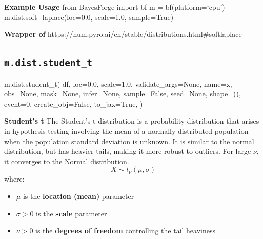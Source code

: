 \documentclass[
  letterpaper,
  DIV=11,
  numbers=noendperiod]{scrartcl}
\newenvironment{Shaded}{\begin{snugshade}}{\end{snugshade}}
\newcommand{\DecValTok}[1]{\textcolor[rgb]{0.68,0.00,0.00}{#1}}
\newcommand{\FloatTok}[1]{\textcolor[rgb]{0.68,0.00,0.00}{#1}}
\newcommand{\NormalTok}[1]{\textcolor[rgb]{0.00,0.23,0.31}{#1}}
\newcommand{\OperatorTok}[1]{\textcolor[rgb]{0.37,0.37,0.37}{#1}}
\newcommand{\StringTok}[1]{\textcolor[rgb]{0.13,0.47,0.30}{#1}}
\newcommand{\VariableTok}[1]{\textcolor[rgb]{0.07,0.07,0.07}{#1}}
\providecommand{\tightlist}{%
  \setlength{\itemsep}{0pt}\setlength{\parskip}{0pt}}\usepackage{longtable,booktabs,array}
\begin{document}
\textbf{Example Usage} from BayesForge import bf m = bf(platform=`cpu')
m.dist.soft\_laplace(loc=0.0, scale=1.0, sample=True)

\textbf{Wrapper of}
https://num.pyro.ai/en/stable/distributions.html\#softlaplace

\subsection{\texorpdfstring{\texttt{m.dist.student\_t}}{m.dist.student\_t}}\label{student_t}

\begin{Shaded}
\begin{Highlighting}[]
\NormalTok{m.dist.student\_t(}
\NormalTok{    df,}
\NormalTok{    loc}\OperatorTok{=}\FloatTok{0.0}\NormalTok{,}
\NormalTok{    scale}\OperatorTok{=}\FloatTok{1.0}\NormalTok{,}
\NormalTok{    validate\_args}\OperatorTok{=}\VariableTok{None}\NormalTok{,}
\NormalTok{    name}\OperatorTok{=}\StringTok{\textquotesingle{}x\textquotesingle{}}\NormalTok{,}
\NormalTok{    obs}\OperatorTok{=}\VariableTok{None}\NormalTok{,}
\NormalTok{    mask}\OperatorTok{=}\VariableTok{None}\NormalTok{,}
\NormalTok{    infer}\OperatorTok{=}\VariableTok{None}\NormalTok{,}
\NormalTok{    sample}\OperatorTok{=}\VariableTok{False}\NormalTok{,}
\NormalTok{    seed}\OperatorTok{=}\VariableTok{None}\NormalTok{,}
\NormalTok{    shape}\OperatorTok{=}\NormalTok{(),}
\NormalTok{    event}\OperatorTok{=}\DecValTok{0}\NormalTok{,}
\NormalTok{    create\_obj}\OperatorTok{=}\VariableTok{False}\NormalTok{,}
\NormalTok{    to\_jax}\OperatorTok{=}\VariableTok{True}\NormalTok{,}
\NormalTok{)}
\end{Highlighting}
\end{Shaded}

\textbf{Student's t} The Student's t-distribution is a probability
distribution that arises in hypothesis testing involving the mean of a
normally distributed population when the population standard deviation
is unknown. It is similar to the normal distribution, but has heavier
tails, making it more robust to outliers. For large \(\nu\), it
converges to the Normal distribution. \[
  X \sim t_\nu(\mu, \sigma)
  \] where:

\begin{itemize}
\tightlist
\item
  \(\mu\) is the \textbf{location (mean)} parameter
\item
  \(\sigma > 0\) is the \textbf{scale} parameter
\item
  \(\nu > 0\) is the \textbf{degrees of freedom} controlling the tail
  heaviness
\end{itemize}
\end{document}
